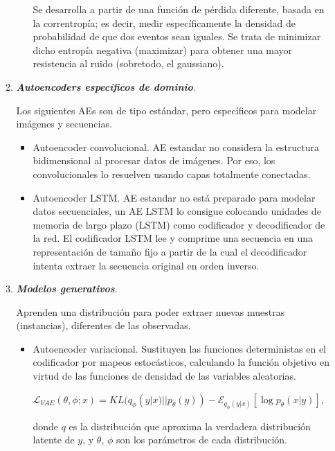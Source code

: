 \begin{enumerate}
\begin{enumerate}
\begin{enumerate}
                Se desarrolla a partir de una función de pérdida diferente, basada en la correntropía; es decir, medir específicamente la densidad de probabilidad de que dos eventos sean iguales. Se trata de minimizar dicho entropía negativa (maximizar) para obtener una mayor resistencia al ruido (sobretodo, el gaussiano).
                
            \end{enumerate}
            \newpage
            
            \item \textit{\textbf{Autoencoders específicos de dominio}}.
            \par Los siguientes AEs son de tipo estándar, pero específicos para modelar imágenes y secuencias.
            
            \begin{itemize}
                \item Autoencoder convolucional. AE estandar no considera la estructura bidimensional al procesar datos de imágenes. Por eso, los convolucionales lo resuelven usando capas totalmente conectadas. 
                
                \item Autoencoder LSTM. AE estandar no está preparado para modelar datos secuenciales, un AE LSTM lo consigue colocando unidades de memoria de largo plazo (LSTM) como codificador y decodificador de la red. El codificador
                LSTM lee y comprime una secuencia en una representación de tamaño fijo
                a partir de la cual el decodificador intenta extraer la secuencia original en
                orden inverso.
            \end{itemize}
            
        \item \textit{\textbf{Modelos generativos}}.
        \par Aprenden una distribución para poder extraer nuevas muestras (instancias), diferentes de las observadas. 
        
        \begin{itemize}
            \item Autoencoder variacional. Sustituyen las funciones deterministas en el codificador por mapeos estocásticos, calculando la función objetivo en virtud de las funciones de densidad de las variables aleatorias. 
            
            \begin{center}
                $\mathcal{L}_{VAE}(\theta,\phi;x) = KL(q_{\phi}(y|x)||p_{\theta}(y)) - \mathcal{E}_{q_{\phi}(y|x)}[\log p_{\theta}(x|y)]$,
            \end{center}
            donde $q$ es la distribución que aproxima la verdadera distribución latente de $y$, y $\theta$, $\phi$ son los parámetros de cada distribución.
            

\end{itemize}
\end{enumerate}
\end{enumerate}
